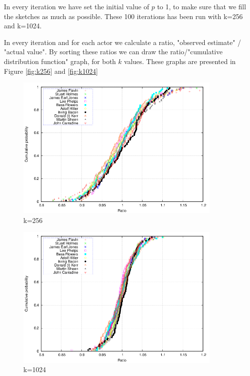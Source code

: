 \documentclass[a4paper,11pt]{article}
\begin{document}
In every iteration we have set the initial value of $p$ to 1, to make sure that we fill the sketches as much as possible.
These 100 iterations has been run with k=256 and k=1024. 

In every iteration and for each actor we calculate a ratio, "observed estimate" / "actual value". By sorting these ratios we can draw the ratio/"cumulative distribution function" graph, for both $k$ values. These graphs are presented in Figure \ref{fig:k256} and \ref{fig:k1024}

\begin{figure}[H]
\centering \includegraphics[width=0.9\textwidth]{plot256.png}
\caption{k=256}\label{fig:k256}
\label{fig:exp256}
\end{figure}
\begin{figure}[H]
\centering \includegraphics[width=0.9\textwidth]{plot1024.png}
\caption{k=1024}\label{fig:k1024}
\label{fig:exp1024}
\end{figure}
\end{document}

